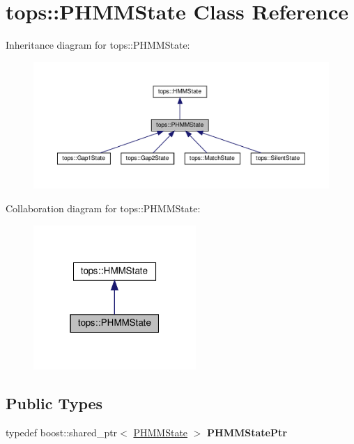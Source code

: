\hypertarget{classtops_1_1PHMMState}{}\section{tops\+:\+:P\+H\+M\+M\+State Class Reference}
\label{classtops_1_1PHMMState}


Inheritance diagram for tops\+:\+:P\+H\+M\+M\+State\+:
\nopagebreak
\begin{figure}[H]
\begin{center}
\leavevmode
\includegraphics[width=350pt]{classtops_1_1PHMMState__inherit__graph}
\end{center}
\end{figure}


Collaboration diagram for tops\+:\+:P\+H\+M\+M\+State\+:
\nopagebreak
\begin{figure}[H]
\begin{center}
\leavevmode
\includegraphics[width=175pt]{classtops_1_1PHMMState__coll__graph}
\end{center}
\end{figure}
\subsection*{Public Types}
\begin{DoxyCompactItemize}
\item 
\mbox{\label{classtops_1_1PHMMState_a7a5ab6ebeb5802de06f58d74b508770f}} 
typedef boost\+::shared\+\_\+ptr$<$ \hyperlink{classtops_1_1PHMMState}{P\+H\+M\+M\+State} $>$ {\bfseries P\+H\+M\+M\+State\+Ptr}
\end{DoxyCompactItemize}
